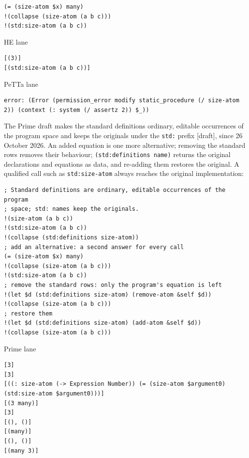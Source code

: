 \documentclass[11pt]{article}
\newcommand{\code}[1]{\texttt{#1}}
\newcommand{\outhead}[1]{{\footnotesize\sffamily #1}\par\vspace{1pt}}
\newcommand{\kind}[1]{\textsf{\small[#1]}}
\begin{document}
\begin{lstlisting}[style=metta,caption={Adding an equation for a builtin on the HE and PeTTa lanes},label={lst:t07b}]
(= (size-atom $x) many)
!(collapse (size-atom (a b c)))
!(std:size-atom (a b c))
\end{lstlisting}
\noindent\begin{minipage}[t]{0.485\textwidth}
\outhead{HE lane}
\begin{lstlisting}[style=out]
[(3)]
[(std:size-atom (a b c))]
\end{lstlisting}
\end{minipage}\hfill
\begin{minipage}[t]{0.485\textwidth}
\outhead{PeTTa lane}
\begin{lstlisting}[style=out]
error: (Error (permission_error modify static_procedure (/ size-atom 2)) (context (: system (/ assertz 2)) $_))
\end{lstlisting}
\end{minipage}

\noindent
The Prime draft makes the standard definitions ordinary, editable occurrences
of the program space and keeps the originals under the \code{std:} prefix
\kind{draft}, since 26 October 2026.  An added equation is one more
alternative; removing the standard rows removes their behaviour;
\code{(std:definitions name)} returns the original declarations and equations
as data, and re-adding them restores the original.  A qualified call such as
\code{std:size-atom} always reaches the original implementation:

\begin{lstlisting}[style=metta,caption={Editing a standard definition on the Prime lane},label={lst:t07}]
; Standard definitions are ordinary, editable occurrences of the program
; space; std: names keep the originals.
!(size-atom (a b c))
!(std:size-atom (a b c))
!(collapse (std:definitions size-atom))
; add an alternative: a second answer for every call
(= (size-atom $x) many)
!(collapse (size-atom (a b c)))
!(std:size-atom (a b c))
; remove the standard rows: only the program's equation is left
!(let $d (std:definitions size-atom) (remove-atom &self $d))
!(collapse (size-atom (a b c)))
; restore them
!(let $d (std:definitions size-atom) (add-atom &self $d))
!(collapse (size-atom (a b c)))
\end{lstlisting}
\noindent\begin{minipage}[t]{0.98\textwidth}
\outhead{Prime lane}
\begin{lstlisting}[style=out]
[3]
[3]
[((: size-atom (-> Expression Number)) (= (size-atom $argument0) (std:size-atom $argument0)))]
[(3 many)]
[3]
[(), ()]
[(many)]
[(), ()]
[(many 3)]
\end{lstlisting}
\end{minipage}
\end{document}
